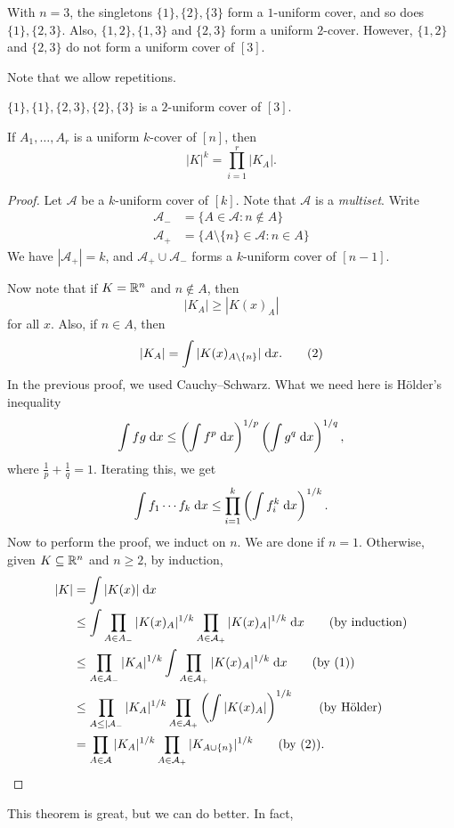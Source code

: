 \documentclass[a4paper]{article}
\begin{document}
\begin{eg}
  With $n = 3$, the singletons $\{1\}, \{2\}, \{3\}$ form a $1$-uniform cover, and so does $\{1\}, \{2, 3\}$. Also, $\{1, 2\}, \{1, 3\}$ and $\{2, 3\}$ form a uniform $2$-cover. However, $\{1, 2\}$ and $\{2, 3\}$ do not form a uniform cover of $[3]$.
\end{eg}
Note that we allow repetitions.
\begin{eg}
  $\{1\}, \{1\}, \{2, 3\}, \{2\}, \{3\}$ is a $2$-uniform cover of $[3]$.
\end{eg}

\begin{thm}
  If $A_1, \ldots, A_r$ is a uniform $k$-cover of $[n]$, then
  \[
    |K|^k = \prod_{i = 1}^r |K_A|.
  \]
\end{thm}

\begin{proof}
  Let $\mathcal{A}$ be a $k$-uniform cover of $[k]$. Note that $\mathcal{A}$ is a \emph{multiset}. Write
  \begin{align*}
    \mathcal{A}_- &= \{A \in \mathcal{A}: n \not \in A\}\\
    \mathcal{A}_+ &= \{A \setminus \{n\} \in \mathcal{A}: n \in A\}
  \end{align*}
  We have $|\mathcal{A}_+| = k$, and $\mathcal{A}_+ \cup \mathcal{A}_-$ forms a $k$-uniform cover of $[n - 1]$.

  Now note that if $K = \mathbb{R}^n$ and $n \not \in A$, then
  \[
    |K_A| \geq |K(x)_A|\tag{1}
  \]
  for all $x$. Also, if $n \in A$, then
  \[
    |K_A| = \int |K(x)_{A \setminus \{n\}}|\;\mathrm{d} x.\tag{2}
  \]
  In the previous proof, we used Cauchy--Schwarz. What we need here is H\"older's inequality
  \[
    \int fg\;\mathrm{d} x \leq \left(\int f^p\;\mathrm{d} x\right)^{1/p} \left(\int g^q\;\mathrm{d} x\right)^{1/q},
  \]
  where $\frac{1}{p} + \frac{1}{q} = 1$. Iterating this, we get
  \[
    \int f_1 \cdots f_k\;\mathrm{d} x\leq \prod_{i = 1}^k \left(\int f_i^k\;\mathrm{d} x\right)^{1/k}.
  \]
  Now to perform the proof, we induct on $n$. We are done if $n = 1$. Otherwise, given $K \subseteq \mathbb{R}^n$ and $n \geq 2$, by induction,
  \begin{align*}
    |K| &= \int |K(x)|\;\d x \\
    &\leq \int \prod_{A \in A_-} |K(x)_A|^{1/k} \prod_{A \in \mathcal{A}_+} |K(x)_A|^{1/k}\;\d x\tag{by induction}\\
    &\leq \prod_{A \in \mathcal{A}_-} |K_A|^{1/k} \int \prod_{A \in \mathcal{A}_+}|K(x)_A|^{1/k}\;\d x\tag{by (1)}\\
    &\leq \prod_{A \leq |\mathcal{A}_-} |K_A|^{1/k} \prod_{A \in \mathcal{A}_+} \left(\int |K(x)_A|\right)^{1/k} \tag{by H\"older}\\
    &= \prod_{A \in \mathcal{A}} |K_A|^{1/k} \prod_{A \in \mathcal{A}_+} |K_{A \cup \{n\}}|^{1/k}\tag{by (2)}.%
  \end{align*}
\end{proof}
This theorem is great, but we can do better. In fact,
\end{document}
